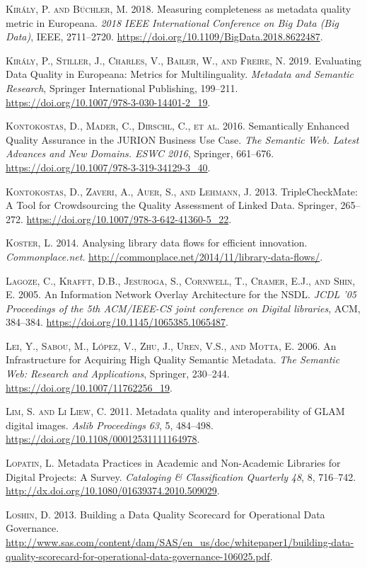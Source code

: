 \textsc{Király, P. and Büchler, M.} 2018. Measuring completeness as metadata quality metric in Europeana. \emph{2018 IEEE International Conference on Big Data (Big Data)}, IEEE, 2711–2720. \url{https://doi.org/10.1109/BigData.2018.8622487}.

\textsc{Király, P., Stiller, J., Charles, V., Bailer, W., and Freire, N.} 2019. Evaluating Data Quality in Europeana: Metrics for Multilinguality. \emph{Metadata and Semantic Research}, Springer International Publishing, 199–211. \url{https://doi.org/10.1007/978-3-030-14401-2_19}.

\textsc{Kontokostas, D., Mader, C., Dirschl, C., et al.} 2016. Semantically Enhanced Quality Assurance in the JURION Business Use Case. \emph{The Semantic Web. Latest Advances and New Domains. ESWC 2016}, Springer, 661–676. \url{https://doi.org/10.1007/978-3-319-34129-3_40}.

\textsc{Kontokostas, D., Zaveri, A., Auer, S., and Lehmann, J.} 2013. TripleCheckMate: A Tool for Crowdsourcing the Quality Assessment of Linked Data. Springer, 265–272. \url{https://doi.org/10.1007/978-3-642-41360-5_22}.

\textsc{Koster, L.} 2014. Analysing library data flows for efficient innovation. \emph{Commonplace.net}. \url{http://commonplace.net/2014/11/library-data-flows/}.

\textsc{Lagoze, C., Krafft, D.B., Jesuroga, S., Cornwell, T., Cramer, E.J., and Shin, E.} 2005. An Information Network Overlay Architecture for the NSDL. \emph{JCDL ’05 Proceedings of the 5th ACM/IEEE-CS joint conference on Digital libraries}, ACM, 384–384. \url{https://doi.org/10.1145/1065385.1065487}.

\textsc{Lei, Y., Sabou, M., López, V., Zhu, J., Uren, V.S., and Motta, E.} 2006. An Infrastructure for Acquiring High Quality Semantic Metadata. \emph{The Semantic Web: Research and Applications}, Springer, 230–244. \url{https://doi.org/10.1007/11762256_19}.

\textsc{Lim, S. and Li Liew, C.} 2011. Metadata quality and interoperability of GLAM digital images. \emph{Aslib Proceedings} \emph{63}, 5, 484–498. \url{https://doi.org/10.1108/00012531111164978}.

\textsc{Lopatin, L.} Metadata Practices in Academic and Non-Academic Libraries for Digital Projects: A Survey. \emph{Cataloging \& Classification Quarterly} \emph{48}, 8, 716–742. \url{http://dx.doi.org/10.1080/01639374.2010.509029}.

\textsc{Loshin, D.} 2013. Building a Data Quality Scorecard for Operational Data Governance. \url{http://www.sas.com/content/dam/SAS/en_us/doc/whitepaper1/building-data-quality-scorecard-for-operational-data-governance-106025.pdf}.

